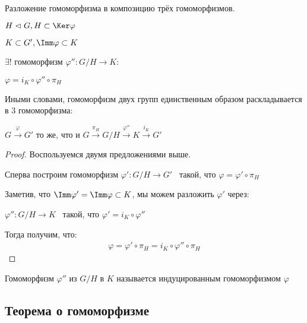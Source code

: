 \begin{theorem-non}
    Разложение гомоморфизма в композицию трёх гомоморфизмов.

    $H \vartriangleleft G, H \subset \Ker \varphi$

    $K \subset G', \Imm \varphi \subset K$

    $\exists !$ гомоморфизм $\varphi'': G / H \to K:$

    $\varphi =  i_K \circ \varphi'' \circ \pi_H$

    Иными словами, гомоморфизм двух групп единственным образом раскладывается в 3 гомоморфизма:

    $G \stackrel{\varphi}{\to} G'$ то же, что и $G \stackrel{\pi_{H}}{\to} G/H \stackrel{\varphi''}{\to} K \stackrel{i_{K}}{\to} G'$

    \begin{proof}
        Воспользуемся двумя предложениями выше.

        Сперва построим гомоморфизм $\varphi': G / H \to G'$ \, такой, что $\varphi = \varphi' \circ \pi_H$

        Заметив, что $\Imm \varphi' = \Imm \varphi \subset K$, мы можем разложить $\varphi'$ через:

        $\varphi'': G / H \to K$ \, такой, что $\varphi' = i_K \circ \varphi''$

        Тогда получим, что: 
        \begin{gather*}
            \varphi = \varphi' \circ \pi_H = i_K \circ \varphi'' \circ \pi_H
        \end{gather*}
    \end{proof}

    \notice Гомоморфизм $\varphi''$ из $G / H$ в $K$ называется индуцированным гомоморфизмом $\varphi$
\end{theorem-non}

\subsection{Теорема о гомоморфизме}

